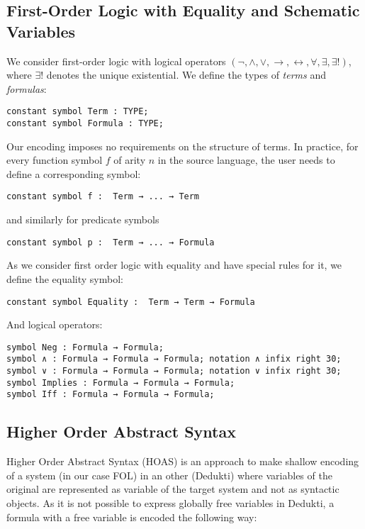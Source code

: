 \documentclass{article}
\begin{document}
\newpage	
	
	\subsection{First-Order Logic with Equality and Schematic Variables}
	We consider first-order logic with logical operators $(\neg, \land, \lor, \rightarrow, \leftrightarrow, \forall, \exists, \exists !)$, where $\exists !$ denotes the unique existential. We define the types of \textit{terms} and \textit{formulas}:

	\begin{lstlisting}[language=Dialekto]
constant symbol Term : TYPE;
constant symbol Formula : TYPE;
	\end{lstlisting}
	Our encoding imposes no requirements on the structure of terms. In practice,  for every function symbol $f$ of arity $n$ in the source language, the user needs to define a corresponding symbol:
	\begin{lstlisting}[language=Dialekto]
constant symbol f :  Term → ... → Term
	\end{lstlisting}
	and similarly for predicate symbols
	\begin{lstlisting}[language=Dialekto]
constant symbol p :  Term → ... → Formula
	\end{lstlisting}
	As we consider first order logic with equality and have special rules for it, we define the equality symbol:
	\begin{lstlisting}[language=Dialekto]
constant symbol Equality :  Term → Term → Formula
	\end{lstlisting}
	And logical operators:
	\begin{lstlisting}[language=Dialekto]
symbol Neg : Formula → Formula;
symbol ∧ : Formula → Formula → Formula; notation ∧ infix right 30;
symbol ∨ : Formula → Formula → Formula; notation ∨ infix right 30;
symbol Implies : Formula → Formula → Formula;
symbol Iff : Formula → Formula → Formula;
\end{lstlisting}
	\subsection{Higher Order Abstract Syntax}
	Higher Order Abstract Syntax (HOAS) is an approach to make shallow encoding of a system (in our case FOL) in an other (Dedukti) where variables of the original are represented as variable of the target system and not as syntactic objects. As it is not possible to express globally free variables in Dedukti, a formula with a free variable is encoded the following way:
	
\end{document}
